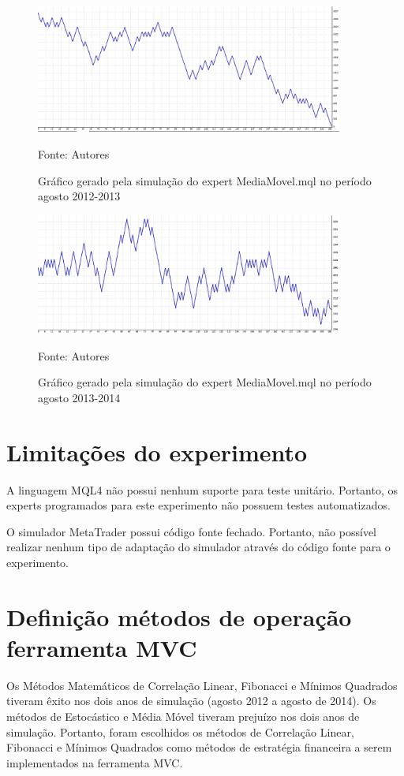 \begin{figure}[htp]
\centering
\includegraphics[width=0.9\textwidth]{figuras/protocoloMedia3}
\caption{ Gráfico gerado pela simulação do expert MediaMovel.mql no período agosto 2012-2013}{Fonte: Autores} 
\label{protocoloMedia3}
\end{figure}

\begin{figure}[htp]
\centering
\includegraphics[width=0.9\textwidth]{figuras/protocoloMedia4}
\caption{ Gráfico gerado pela simulação do expert MediaMovel.mql no período agosto 2013-2014}{Fonte: Autores} 
\label{protocoloMedia4}
\end{figure}

\section{Limitações do experimento}

A linguagem MQL4 não possui nenhum suporte para teste unitário. Portanto, os experts programados para este experimento não possuem testes automatizados. 

O simulador MetaTrader possui código fonte fechado. Portanto, não possível realizar nenhum tipo de adaptação do simulador através do código fonte para o experimento.

\section{Definição métodos de operação ferramenta MVC}

Os Métodos Matemáticos de Correlação Linear, Fibonacci e Mínimos Quadrados tiveram êxito nos dois anos de simulação (agosto 2012 a agosto de 2014). Os métodos de Estocástico e Média Móvel tiveram prejuízo nos dois anos de simulação. Portanto, foram escolhidos os métodos de Correlação Linear, Fibonacci e Mínimos Quadrados como métodos de estratégia financeira a serem implementados na ferramenta MVC.

